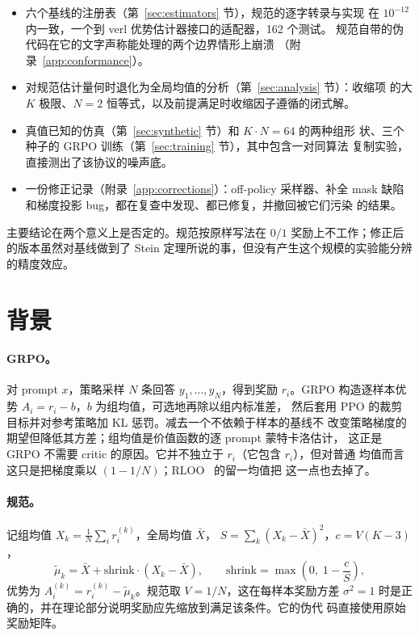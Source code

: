 \documentclass{article}
\newcommand{\shrink}{\mathrm{shrink}}
\begin{document}
\begin{itemize}\itemsep2pt
\item 六个基线的注册表（第~\ref{sec:estimators} 节），规范的逐字转录与实现
      在 $10^{-12}$ 内一致，一个到 verl 优势估计器接口的适配器，162 个测试。
      规范自带的伪代码在它的文字声称能处理的两个边界情形上崩溃
      （附录~\ref{app:conformance}）。
\item 对规范估计量何时退化为全局均值的分析（第~\ref{sec:analysis} 节）：收缩项
      的大 $K$ 极限、$N=2$ 恒等式，以及前提满足时收缩因子遵循的闭式解。
\item 真值已知的仿真（第~\ref{sec:synthetic} 节）和 $K\cdot N=64$ 的两种组形
      状、三个种子的 GRPO 训练（第~\ref{sec:training} 节），其中包含一对同算法
      复制实验，直接测出了该协议的噪声底。
\item 一份修正记录（附录~\ref{app:corrections}）：off-policy 采样器、补全
      mask 缺陷和梯度投影 bug，都在复查中发现、都已修复，并撤回被它们污染
      的结果。
\end{itemize}

主要结论在两个意义上是否定的。规范按原样写法在 $0/1$ 奖励上不工作；修正后
的版本虽然对基线做到了 Stein 定理所说的事，但没有产生这个规模的实验能分辨
的精度效应。

\section{背景}

\paragraph{GRPO。} 对 prompt $x$，策略采样 $N$ 条回答 $y_1,\dots,y_N$，得到奖励
$r_i$。GRPO 构造逐样本优势 $A_i=r_i-b$，$b$ 为组均值，可选地再除以组内标准差，
然后套用 PPO 的裁剪目标并对参考策略加 KL 惩罚。减去一个不依赖于样本的基线不
改变策略梯度的期望但降低其方差；组均值是价值函数的逐 prompt 蒙特卡洛估计，
这正是 GRPO 不需要 critic 的原因。它并不独立于 $r_i$（它包含 $r_i$），但对普通
均值而言这只是把梯度乘以 $(1-1/N)$；RLOO~\citep{ahmadian2024rloo} 的留一均值把
这一点也去掉了。

\paragraph{规范。} 记组均值 $X_k=\frac1N\sum_i r_i^{(k)}$，全局均值 $\bar X$，
$S=\sum_k(X_k-\bar X)^2$，$c=V(K-3)$，
\begin{equation}
\tilde\mu_k=\bar X+\shrink\cdot(X_k-\bar X),\qquad
\shrink=\max\!\left(0,\;1-\frac{c}{S}\right),
\label{eq:js}
\end{equation}
优势为 $A_i^{(k)}=r_i^{(k)}-\tilde\mu_k$。规范取 $V=1/N$，这在每样本奖励方差
$\sigma^2=1$ 时是正确的，并在理论部分说明奖励应先缩放到满足该条件。它的伪代
码直接使用原始奖励矩阵。
\end{document}
